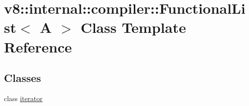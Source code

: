 \hypertarget{classv8_1_1internal_1_1compiler_1_1FunctionalList}{}\section{v8\+:\+:internal\+:\+:compiler\+:\+:Functional\+List$<$ A $>$ Class Template Reference}
\label{classv8_1_1internal_1_1compiler_1_1FunctionalList}
\subsection*{Classes}
\begin{DoxyCompactItemize}
\item 
class \mbox{\hyperlink{classv8_1_1internal_1_1compiler_1_1FunctionalList_1_1iterator}{iterator}}
\end{DoxyCompactItemize}

